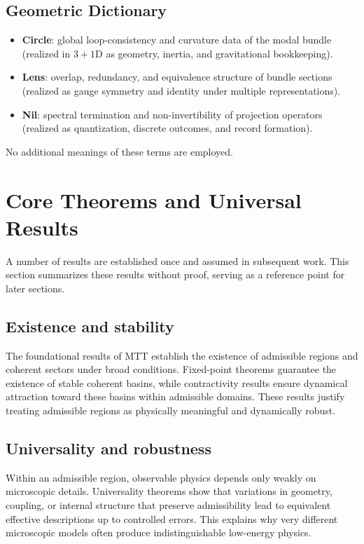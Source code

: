\documentclass[11pt]{article}
\begin{document}
\subsection*{Geometric Dictionary}
\begin{itemize}
  \item \textbf{Circle}: global loop-consistency and curvature data of the modal bundle
  (realized in $3+1$D as geometry, inertia, and gravitational bookkeeping).
  \item \textbf{Lens}: overlap, redundancy, and equivalence structure of bundle sections
  (realized as gauge symmetry and identity under multiple representations).
  \item \textbf{Nil}: spectral termination and non-invertibility of projection operators
  (realized as quantization, discrete outcomes, and record formation).
\end{itemize}
No additional meanings of these terms are employed.


\section{Core Theorems and Universal Results}

A number of results are established once and assumed in subsequent work. This section summarizes these results without proof, serving as a reference point for later sections.

\subsection{Existence and stability}

The foundational results of MTT establish the existence of admissible regions and coherent sectors under broad conditions. Fixed-point theorems guarantee the existence of stable coherent basins, while contractivity results ensure dynamical attraction toward these basins within admissible domains. These results justify treating admissible regions as physically meaningful and dynamically robust.

\subsection{Universality and robustness}

Within an admissible region, observable physics depends only weakly on microscopic details. Universality theorems show that variations in geometry, coupling, or internal structure that preserve admissibility lead to equivalent effective descriptions up to controlled errors. This explains why very different microscopic models often produce indistinguishable low-energy physics.
\end{document}
